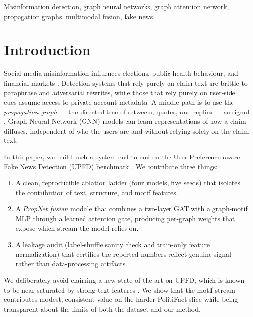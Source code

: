 \documentclass[conference]{IEEEtran}
\begin{document}
\begin{IEEEkeywords}
Misinformation detection, graph neural networks, graph attention network, propagation graphs, multimodal fusion, fake news.
\end{IEEEkeywords}

\section{Introduction}
Social-media misinformation influences elections, public-health behaviour, and financial markets \cite{shu2017survey,vosoughi2018spread}. Detection systems that rely purely on claim text are brittle to paraphrase and adversarial rewrites, while those that rely purely on user-side cues assume access to private account metadata. A middle path is to use the \emph{propagation graph} --- the directed tree of retweets, quotes, and replies --- as signal \cite{monti2019fakegcn,bian2020bigcn}. Graph-Neural-Network (GNN) models can learn representations of how a claim diffuses, independent of who the users are and without relying solely on the claim text.

In this paper, we build such a system end-to-end on the User Preference-aware Fake News Detection (UPFD) benchmark \cite{dou2021upfd}. We contribute three things:

\begin{enumerate}
\item A clean, reproducible ablation ladder (four models, five seeds) that isolates the contribution of text, structure, and motif features.
\item A \emph{PropNet fusion} module that combines a two-layer GAT with a graph-motif MLP through a learned attention gate, producing per-graph weights that expose which stream the model relies on.
\item A leakage audit (label-shuffle sanity check and train-only feature normalization) that certifies the reported numbers reflect genuine signal rather than data-processing artifacts.
\end{enumerate}

We deliberately avoid claiming a new state of the art on UPFD, which is known to be near-saturated by strong text features \cite{dou2021upfd}. We show that the motif stream contributes modest, consistent value on the harder PolitiFact slice while being transparent about the limits of both the dataset and our method.

\end{document}
